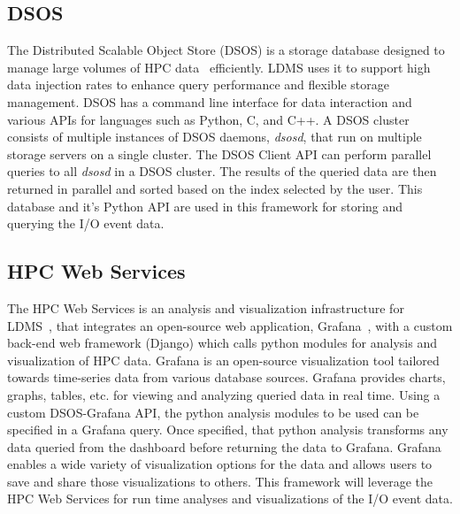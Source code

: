 \subsection{DSOS}
The Distributed Scalable Object Store (DSOS) is a storage database designed to manage large volumes of HPC data~\cite{sosgithub} efficiently. LDMS uses it to support high data injection rates to enhance query performance and flexible storage management. 
DSOS has a command line interface for data interaction and various APIs for languages such as Python, C, and C++. A DSOS cluster consists of multiple instances of DSOS daemons, \emph{dsosd}, that run on multiple storage servers on a single cluster. The DSOS Client API can perform parallel queries to all \emph{dsosd} in a DSOS cluster. The results of the queried data are then returned in parallel and sorted based on the index selected by the user. This database and it's Python API are used in this framework for storing and querying the I/O event data. 
\subsection{HPC Web Services}
The HPC Web Services is an analysis and visualization infrastructure for LDMS~\cite{ClusterAV}, that integrates an open-source web application, Grafana~\cite{grafana-website}, with a custom back-end web framework (Django)  which calls python modules for analysis and visualization of HPC data. Grafana is an open-source visualization tool tailored towards time-series data from various database sources. Grafana provides charts, graphs, tables, etc. for viewing and analyzing queried data in real time. Using a custom DSOS-Grafana API, the python analysis modules to be used can be specified in a Grafana query. Once specified, that python analysis transforms any data queried from the dashboard before returning the data to Grafana. Grafana enables a wide variety of visualization options for the data and allows users to save and share those visualizations to others. This framework will leverage the HPC Web Services for run time analyses and visualizations of the I/O event data.
